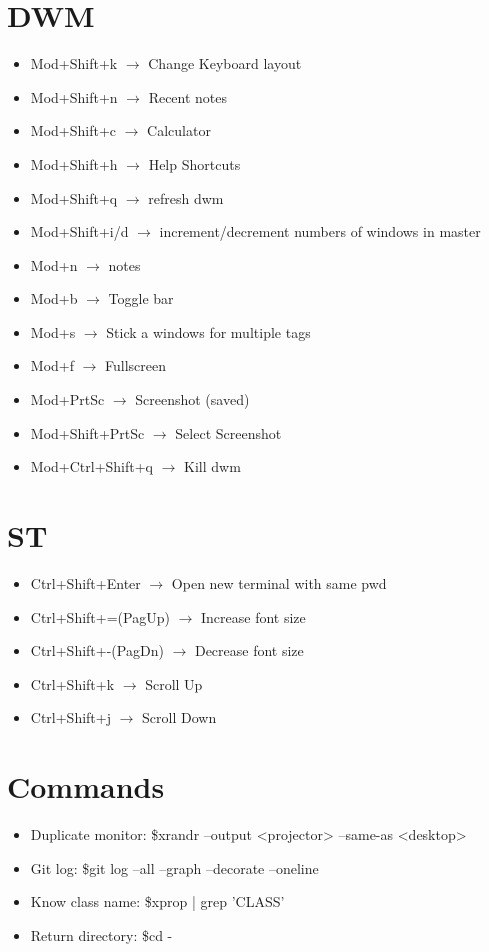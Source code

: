 \documentclass[a4paper,10pt]{article}
\begin{document}
\section{DWM}
\begin{itemize}
  \item Mod+Shift+k $\to$ Change Keyboard layout
  \item Mod+Shift+n $\to$ Recent notes
  \item Mod+Shift+c $\to$ Calculator
  \item Mod+Shift+h $\to$ Help Shortcuts
  \item Mod+Shift+q $\to$ refresh dwm
  \item Mod+Shift+i/d $\to$ increment/decrement numbers of windows in master
  \item Mod+n $\to$ notes
  \item Mod+b $\to$ Toggle bar
  \item Mod+s $\to$ Stick a windows for multiple tags
  \item Mod+f $\to$ Fullscreen
  \item Mod+PrtSc $\to$ Screenshot (saved)
  \item Mod+Shift+PrtSc $\to$ Select Screenshot
  \item Mod+Ctrl+Shift+q $\to$ Kill dwm
\end{itemize}

\section{ST}
\begin{itemize}
  \item Ctrl+Shift+Enter $\to$ Open new terminal with same pwd
  \item Ctrl+Shift+=(PagUp) $\to$ Increase font size
  \item Ctrl+Shift+-(PagDn) $\to$ Decrease font size
  \item Ctrl+Shift+k $\to$ Scroll Up
  \item Ctrl+Shift+j $\to$ Scroll Down
\end{itemize}
\section{Commands}
\begin{itemize}
  \item Duplicate monitor: \$xrandr --output <projector> --same-as <desktop>
  \item Git log: \$git log --all --graph --decorate --oneline
  \item Know class name: \$xprop | grep 'CLASS'
  \item Return directory: \$cd -
\end{itemize}
    \newpage
\end{document}
